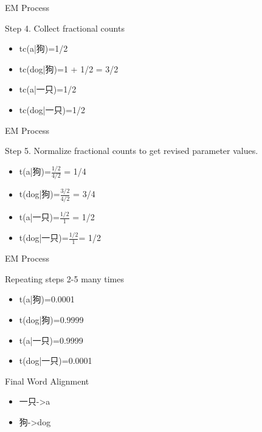 \documentclass{beamer}
\begin{document}
\begin{frame}{EM Process}
    \begin{block}{Step 4. Collect fractional counts}
        \begin{itemize}
            \item tc(a|狗)=1/2
            \item tc(dog|狗)=1 + 1/2 = 3/2
            \item tc(a|一只)=1/2
            \item tc(dog|一只)=1/2
        \end{itemize}
    \end{block}
\end{frame}

\begin{frame}{EM Process}
    \begin{block}{Step 5. Normalize fractional counts to get revised parameter values.}
        \begin{itemize}
            \item t(a|狗)=$\frac{1/2}{4/2}$ = 1/4
            \item t(dog|狗)=$\frac{3/2}{4/2}$ = 3/4
            \item t(a|一只)=$\frac{1/2}{1}$ = 1/2
            \item t(dog|一只)=$\frac{1/2}{1}$= 1/2
        \end{itemize}
    \end{block}
\end{frame}

\begin{frame}{EM Process}
\begin{center}
    \begin{overprint}
    \begin{block}{Repeating steps 2-5 many times}
        \begin{itemize}
            \item t(a|狗)=0.0001
            \item t(dog|狗)=0.9999
            \item t(a|一只)=0.9999
            \item t(dog|一只)=0.0001
        \end{itemize}
    \end{block}

    \begin{block}{Final Word Alignment}
        \begin{itemize}
            \item 一只->a
            \item 狗->dog
        \end{itemize}
    
    \end{block}
    \end{overprint}
\end{center}
\end{frame}
\end{document}
